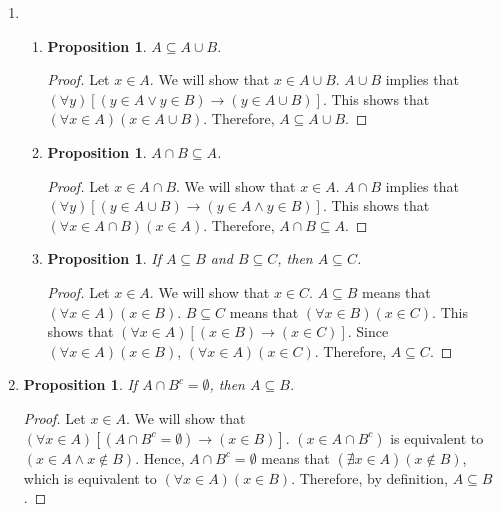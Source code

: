 \documentclass{article}
\newtheorem{prop}[thm]{Proposition}
\begin{document}
\begin{enumerate}
\item \begin{enumerate}
    \item \begin{prop}
    $A \subseteq A \cup B$.
    \end{prop}
    \begin{proof}
    Let $x \in A$. We will show that $x \in A \cup B$.
    $A \cup B$ implies that $(\forall y)[(y \in A \vee y \in B) \rightarrow (y \in A \cup B)]$. This shows that $(\forall x \in A)(x \in A \cup B)$. Therefore, $A \subseteq A \cup B$.
    \end{proof}
    \item \begin{prop}
    $A \cap B \subseteq A$.
    \end{prop}
    \begin{proof}
    Let $x \in A \cap B$. We will show that $x \in A$. $A \cap B$ implies that $(\forall y)[(y \in A \cup B) \rightarrow (y \in A \wedge y \in B)]$. This shows that $(\forall x \in A \cap B)(x \in A)$. Therefore, $A \cap B \subseteq A$.
    \end{proof}
    \item \begin{prop}
    If $A \subseteq B$ and $B \subseteq C$, then $A \subseteq C$.
    \end{prop}
    \begin{proof}
    Let $x \in A$. We will show that $x \in C$. $A \subseteq B$ means that $(\forall x \in A)(x \in B)$. $B \subseteq C$ means that $(\forall x \in B)(x \in C)$. This shows that $(\forall x \in A)[(x \in B) \rightarrow (x \in C)]$. Since $(\forall x \in A)(x \in B)$, $(\forall x \in A)(x \in C)$. Therefore, $A \subseteq C$.
    \end{proof}
\end{enumerate}

\item \begin{prop}
    If $A \cap B^{c} = \emptyset$, then $A \subseteq B$.
\end{prop}

\begin{proof}
Let $x \in A$. We will show that $(\forall x \in A)[(A \cap B^{c} = \emptyset) \rightarrow (x \in B)]$. $(x \in A \cap B^{c})$ is equivalent to $(x \in A \wedge x \notin B)$. Hence, $A \cap B^{c} = \emptyset$ means that $(\nexists x \in A)(x \notin B)$, which is equivalent to $(\forall x \in A)(x \in B)$. Therefore, by definition, $A \subseteq B$.
\end{proof}
    
\end{enumerate}
\end{document}
